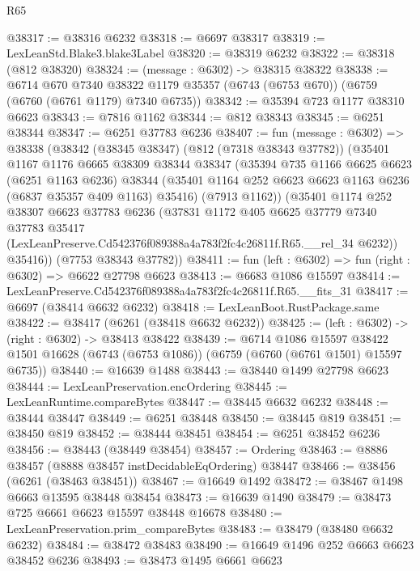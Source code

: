 \begin{lexlean}{R65}
\begin{coremodule}
{@38317 := @38316 @6232
@38318 := @6697 @38317
@38319 := LexLeanStd.Blake3.blake3Label
@38320 := @38319 @6232
@38322 := @38318 (@812 @38320)
@38324 := (message : @6302) -> @38315 @38322
@38338 := @6714
    @670
    @7340
    @38322
    @1179
    @35357
    (@6743 (@6753 @670))
    (@6759 (@6760 (@6761 @1179) @7340 @6735))
@38342 := @35394 @723 @1177 @38310 @6623
@38343 := @7816 @1162
@38344 := @812 @38343
@38345 := @6251 @38344
@38347 := @6251 @37783 @6236
@38407 := fun (message : @6302) =>
  @38338
    (@38342
      (@38345 @38347)
      (@812 (@7318 @38343 @37782))
      (@35401
        @1167
        @1176
        @6665
        @38309
        @38344
        @38347
        (@35394
          @735
          @1166
          @6625
          @6623
          (@6251 @1163 @6236)
          @38344
          (@35401 @1164 @252 @6623 @6623 @1163 @6236 (@6837 @35357 @409 @1163) @35416)
          (@7913 @1162))
        (@35401
          @1174
          @252
          @38307
          @6623
          @37783
          @6236
          (@37831
            @1172
            @405
            @6625
            @37779
            @7340
            @37783
            @35417
            (LexLeanPreserve.Cd542376f089388a4a783f2fc4c26811f.R65.__rel_34 @6232))
          @35416))
      (@7753 @38343 @37782))
@38411 := fun (left : @6302) => fun (right : @6302) => @6622 @27798 @6623
@38413 := @6683 @1086 @15597
@38414 := LexLeanPreserve.Cd542376f089388a4a783f2fc4c26811f.R65.__fits_31
@38417 := @6697 (@38414 @6632 @6232)
@38418 := LexLeanBoot.RustPackage.same
@38422 := @38417 (@6261 (@38418 @6632 @6232))
@38425 := (left : @6302) -> (right : @6302) -> @38413 @38422
@38439 := @6714
    @1086
    @15597
    @38422
    @1501
    @16628
    (@6743 (@6753 @1086))
    (@6759 (@6760 (@6761 @1501) @15597 @6735))
@38440 := @16639 @1488
@38443 := @38440 @1499 @27798 @6623
@38444 := LexLeanPreservation.encOrdering
@38445 := LexLeanRuntime.compareBytes
@38447 := @38445 @6632 @6232
@38448 := @38444 @38447
@38449 := @6251 @38448
@38450 := @38445 @819
@38451 := @38450 @819
@38452 := @38444 @38451
@38454 := @6251 @38452 @6236
@38456 := @38443 (@38449 @38454)
@38457 := Ordering
@38463 := @8886 @38457 (@8888 @38457 instDecidableEqOrdering) @38447
@38466 := @38456 (@6261 (@38463 @38451))
@38467 := @16649 @1492
@38472 := @38467 @1498 @6663 @13595 @38448 @38454
@38473 := @16639 @1490
@38479 := @38473 @725 @6661 @6623 @15597 @38448 @16678
@38480 := LexLeanPreservation.prim_compareBytes
@38483 := @38479 (@38480 @6632 @6232)
@38484 := @38472 @38483
@38490 := @16649 @1496 @252 @6663 @6623 @38452 @6236
@38493 := @38473 @1495 @6661 @6623
}
\end{coremodule}
\end{lexlean}
